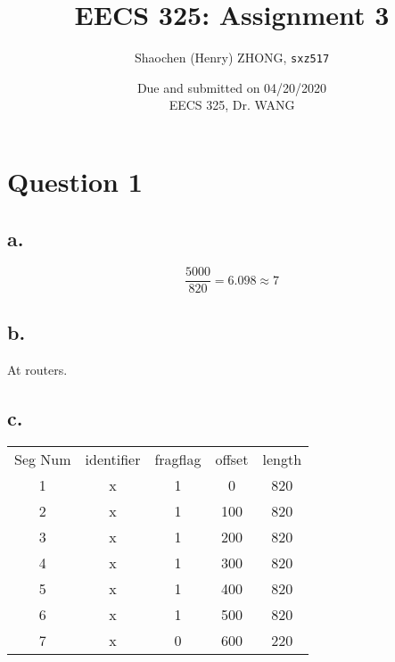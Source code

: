 \documentclass[12pt]{article}
\newcommand{\ilc}{\texttt}
\begin{document}
\title{\textbf{EECS 325: Assignment 3}}

\author{Shaochen (Henry) ZHONG, \ilc{sxz517} }
\date{Due and submitted on 04/20/2020 \\ EECS 325, Dr. WANG}
\maketitle

\section{Question 1}

\subsection{a.}

\begin{equation*}
    \frac{5000}{820} = 6.098 \approx 7
\end{equation*}

\subsection{b.}

At routers.

\subsection{c.}

\begin{table}[H]
\begin{tabular}{ccccc}
\cline{1-1}
\multicolumn{1}{|c|}{Seg Num} & identifier & fragflag & offset & length \\ \cline{1-1}
1                                & x        & 1        & 0      & 820    \\
2                                & x        & 1        & 100    & 820    \\
3                                & x        & 1        & 200    & 820    \\
4                                & x        & 1        & 300    & 820    \\
5                                & x        & 1        & 400    & 820    \\
6                                & x        & 1        & 500    & 820    \\
7                                & x        & 0        & 600    & 220
\end{tabular}
\end{table}
\end{document}
